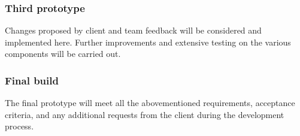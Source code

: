 \documentclass[12pt,a4paper,twoside]{article}
\begin{document}
\subsubsection{Third prototype}
Changes proposed by client and team feedback will be considered and implemented here. Further improvements and extensive testing on the various components will be carried out.

\subsubsection{Final build}
The final prototype will meet all the abovementioned requirements, acceptance criteria, and any additional requests from the client during the development process.
\end{document}

